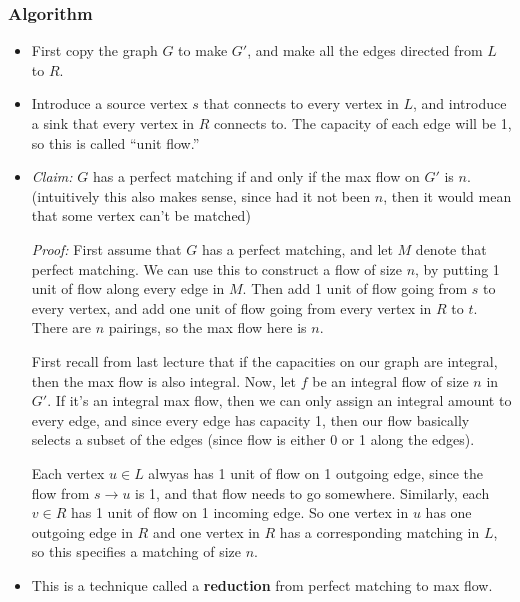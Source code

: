 \subsubsection{Algorithm}
\begin{itemize}
	\item First copy the graph \(G\) to make \(G'\), and make all the edges directed from \(L\) to \( R\). 
	\item Introduce a source vertex \(s\) that connects to every vertex in \(L\), and introduce a sink 
		that every vertex in  \(R\) connects to. The capacity of each edge will be 1, so this is called 
		``unit flow.''
	\item \textit{Claim:} \(G\) has a perfect matching if and only if the max flow on \(G'\) is \(n\). 
		(intuitively this also makes sense, since had it not been \(n\), then it would mean that 
		some vertex can't be matched)

		\textit{Proof:} First assume that \(G \) has a perfect matching, and let \(M\) denote that perfect 
		matching. We can use this to construct a flow of size \(n\), by putting 1 unit of flow along every 
		edge in \(M\). Then add 1 unit of flow going from \(s\) to every vertex, and add one unit of flow 
		going from every vertex in \(R\) to \(t\). There are \(n\) pairings, so the max flow here is \(n\). 

		First recall from last lecture that if the capacities on our graph are integral, then the max flow is 
		also integral. Now, let \(f\) be an integral flow of size \(n\) in \(G'\). If it's an integral 
		max flow, then we can only assign an integral amount to every edge, and since every edge has capacity 1,
		then our flow basically selects a subset of the edges (since flow is either 0 or 1 along the edges). 

		Each vertex \(u \in L\) alwyas has 1 unit of flow on 1 outgoing edge, since the flow from \(s \to u\)
		is 1, and that flow needs to go somewhere. Similarly, each \(v \in R\) has 1 unit of flow on 1 incoming
		edge. So one vertex in \(u\) has one outgoing edge in \(R\) and one vertex in \(R\) has a 
		corresponding matching in \(L\), so this specifies a matching of size \(n\). 

	\item This is a technique called a \textbf{reduction} from perfect matching to max flow.  
\end{itemize}

